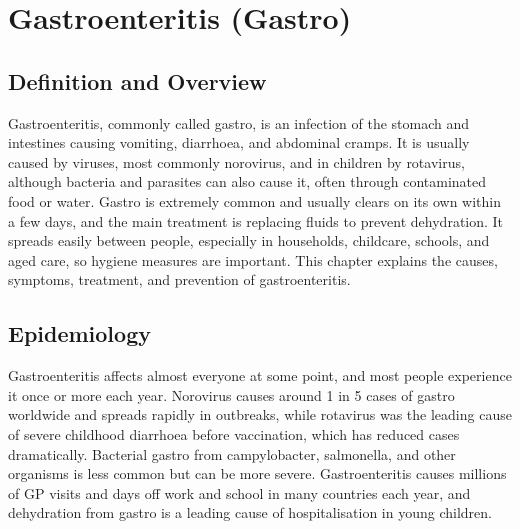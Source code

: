 \chapter{Gastroenteritis (Gastro)}

\section*{Definition and Overview}
Gastroenteritis, commonly called gastro, is an infection of the stomach and intestines causing vomiting, diarrhoea, and abdominal cramps. It is usually caused by viruses, most commonly norovirus, and in children by rotavirus, although bacteria and parasites can also cause it, often through contaminated food or water. Gastro is extremely common and usually clears on its own within a few days, and the main treatment is replacing fluids to prevent dehydration. It spreads easily between people, especially in households, childcare, schools, and aged care, so hygiene measures are important. This chapter explains the causes, symptoms, treatment, and prevention of gastroenteritis.

\section*{Epidemiology}
Gastroenteritis affects almost everyone at some point, and most people experience it once or more each year. Norovirus causes around 1 in 5 cases of gastro worldwide and spreads rapidly in outbreaks, while rotavirus was the leading cause of severe childhood diarrhoea before vaccination, which has reduced cases dramatically. Bacterial gastro from campylobacter, salmonella, and other organisms is less common but can be more severe. Gastroenteritis causes millions of GP visits and days off work and school in many countries each year, and dehydration from gastro is a leading cause of hospitalisation in young children.

